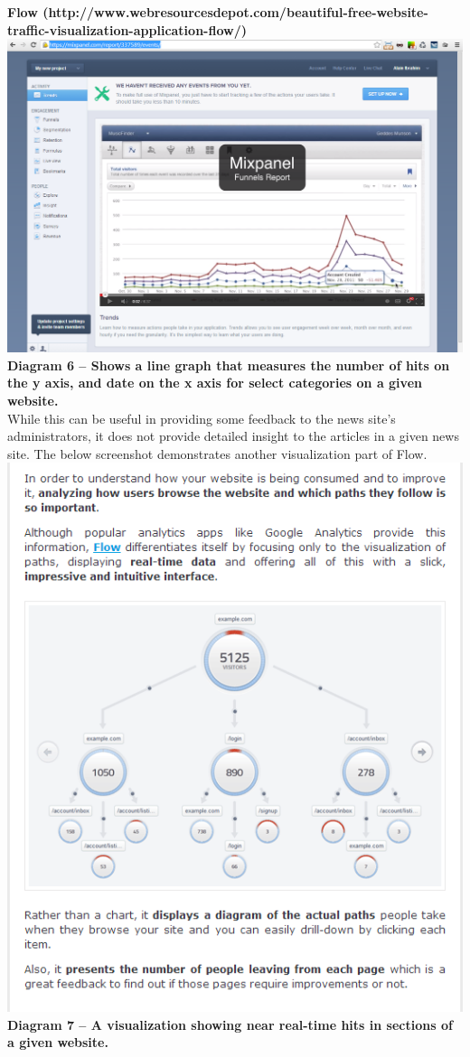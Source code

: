 \documentclass[12pt]{article}
\begin{document}
\noindent\textbf{Flow (http://www.webresourcesdepot.com/beautiful-free-website-traffic-visualization-application-flow/)} \\
\noindent\includegraphics[scale=0.45]{img/flow}
\noindent\textbf{Diagram 6 -- Shows a line graph that measures the number of hits on the y axis, and date on the x axis for select categories on a given website.} \\

While this can be useful in providing some feedback to the news site's administrators, it does not provide detailed insight to the articles in a given news site. The below screenshot demonstrates another visualization part of Flow. \\
\noindent\includegraphics[scale=1]{img/flow1}
\noindent\textbf{Diagram 7 -- A visualization showing near real-time hits in sections of a given website.} \\
\end{document}
